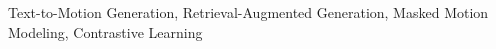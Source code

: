 \documentclass[10pt,journal,compsoc]{IEEEtran}
\begin{document}
{\begin{abstract}
\end{abstract}

\begin{IEEEkeywords}
Text-to-Motion Generation, Retrieval-Augmented Generation, Masked Motion Modeling, Contrastive Learning
\end{IEEEkeywords}}


\maketitle


\IEEEdisplaynontitleabstractindextext


%
\IEEEpeerreviewmaketitle




\end{document}
